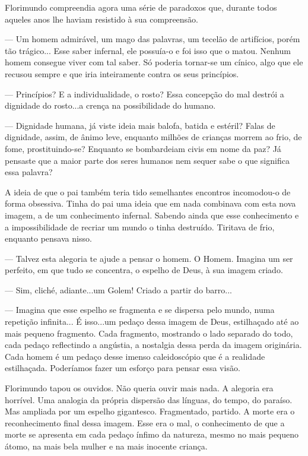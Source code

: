 Florimundo compreendia agora uma série de paradoxos que, durante todos
aqueles anos lhe haviam resistido à sua compreensão.

--- Um homem admirável, um mago das palavras, um tecelão de artifícios,
porém tão trágico... Esse saber infernal, ele possuía-o e foi isso que o
matou. Nenhum homem consegue viver com tal saber. Só poderia tornar-se
um cínico, algo que ele recusou sempre e que iria inteiramente contra os
seus princípios.

--- Princípios? E a individualidade, o rosto? Essa concepção do mal
destrói a dignidade do rosto...a crença na possibilidade do humano.

--- Dignidade humana, já viste ideia mais balofa, batida e estéril? Falas
de dignidade, assim, de ânimo leve, enquanto milhões de crianças morrem
ao frio, de fome, prostituindo-se? Enquanto se bombardeiam civis em nome
da paz? Já pensaste que a maior parte dos seres humanos nem sequer sabe
o que significa essa palavra?

A ideia de que o pai também teria tido semelhantes encontros incomodou-o
de forma obsessiva. Tinha do pai uma ideia que em nada combinava com
esta nova imagem, a de um conhecimento infernal. Sabendo ainda que esse
conhecimento e a impossibilidade de recriar um mundo o tinha destruído.
Tiritava de frio, enquanto pensava nisso.

--- Talvez esta alegoria te ajude a pensar o homem. O Homem. Imagina um
ser perfeito, em que tudo se concentra, o espelho de Deus, à sua imagem
criado.

--- Sim, cliché, adiante...um Golem! Criado a partir do barro...

--- Imagina que esse espelho se fragmenta e se dispersa pelo mundo, numa
repetição infinita... É isso...um pedaço dessa imagem de Deus,
estilhaçado até ao mais pequeno fragmento. Cada fragmento, mostrando o
lado separado do todo, cada pedaço reflectindo a angústia, a nostalgia
dessa perda da imagem originária. Cada homem é um pedaço desse imenso
caleidoscópio que é a realidade estilhaçada. Poderíamos fazer um esforço
para pensar essa visão.

Florimundo tapou os ouvidos. Não queria ouvir mais nada. A alegoria era
horrível. Uma analogia da própria dispersão das línguas, do tempo, do
paraíso. Mas ampliada por um espelho gigantesco. Fragmentado, partido. A
morte era o reconhecimento final dessa imagem. Esse era o mal, o
conhecimento de que a morte se apresenta em cada pedaço ínfimo da
natureza, mesmo no mais pequeno átomo, na mais bela mulher e na mais
inocente criança.

